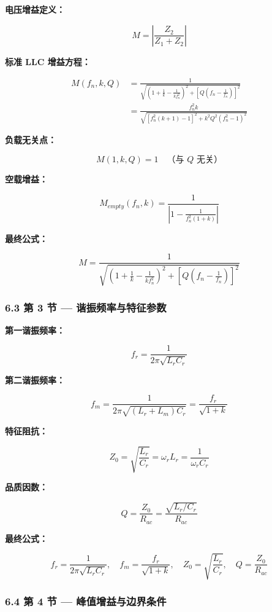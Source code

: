 \documentclass[UTF8]{ctexart}
\begin{document}
\textbf{电压增益定义：}

\[
M = \left| \frac{Z_2}{Z_1 + Z_2} \right|
\]

\textbf{标准 LLC 增益方程：}

\[
\begin{aligned}
M(f_n, k, Q) &= \frac{1}{\sqrt{\left(1 + \frac{1}{k} - \frac{1}{k f_n^2}\right)^2 + \left[Q\left(f_n - \frac{1}{f_n}\right)\right]^2}} \\ &= \frac{f_n^2 k}{\sqrt{\left[f_n^2(k+1) - 1\right]^2 + k^2 Q^2 (f_n^2 - 1)^2}}
\end{aligned}
\]

\textbf{负载无关点：}

\[
M(1, k, Q) = 1 \quad \text{（与 } Q \text{ 无关）}
\]

\textbf{空载增益：}

\[
M_{empty}(f_n, k) = \frac{1}{\left|1 - \frac{1}{f_n^2(1 + k)}\right|}
\]

\textbf{最终公式：}

\[
M = \frac{1}{\sqrt{\left(1 + \frac{1}{k} - \frac{1}{k f_n^2}\right)^2 + \left[Q\left(f_n - \frac{1}{f_n}\right)\right]^2}}
\]

\subsubsection*{6.3 第 3 节 — 谐振频率与特征参数}

\textbf{第一谐振频率：}

\[
f_r = \frac{1}{2\pi\sqrt{L_r C_r}}
\]

\textbf{第二谐振频率：}

\[
f_m = \frac{1}{2\pi\sqrt{(L_r + L_m) C_r}} = \frac{f_r}{\sqrt{1 + k}}
\]

\textbf{特征阻抗：}

\[
Z_0 = \sqrt{\frac{L_r}{C_r}} = \omega_r L_r = \frac{1}{\omega_r C_r}
\]

\textbf{品质因数：}

\[
Q = \frac{Z_0}{R_{ac}} = \frac{\sqrt{L_r / C_r}}{R_{ac}}
\]

\textbf{最终公式：}

\[
f_r = \frac{1}{2\pi\sqrt{L_r C_r}}, \quad f_m = \frac{f_r}{\sqrt{1 + k}}, \quad Z_0 = \sqrt{\frac{L_r}{C_r}}, \quad Q = \frac{Z_0}{R_{ac}}
\]

\subsubsection*{6.4 第 4 节 — 峰值增益与边界条件}
\end{document}
